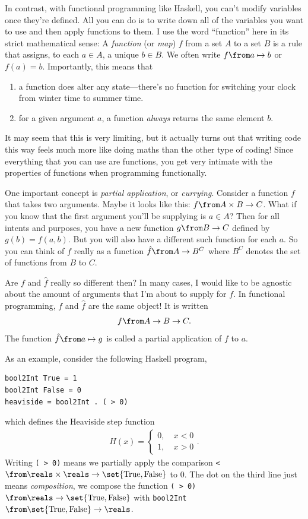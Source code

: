 In contrast, with functional programming like Haskell, you can't modify variables once they're defined.
All you can do is to write down all of the variables you want to use and then apply functions to them.
I use the word \enquote{function} here in its strict mathematical sense: A \emph{function} (or \emph{map}) $f$ from a set $A$ to a set $B$ is a rule that assigns, to each $a \in A$, a unique $b \in B$.
We often write $f \from a \mapsto b$ or $f(a) = b$.
Importantly, this means that
\begin{enumerate}
	\item a function does alter any state---there's no function for switching your clock from winter time to summer time.
	\item for a given argument $a$, a function \emph{always} returns the same element $b$.
\end{enumerate}

It may seem that this is very limiting, but it actually turns out that writing code this way feels much more like doing maths than the other type of coding!
Since everything that you can use are functions, you get very intimate with the properties of functions when programming functionally.

One important concept is \emph{partial application}, or \emph{currying}.
Consider a function $f$ that takes two arguments.
Maybe it looks like this: $f \from A \times B \to C$.
What if you know that the first argument you'll be supplying is $a \in A$?
Then for all intents and purposes, you have a new function $g \from B \to C$ defined by $g(b) = f(a, b)$.
But you will also have a different such function for each $a$.
So you can think of $f$ really as a function $\hat f\from A \to B^C$ where $B^C$ denotes the set of functions from $B$ to $C$.

Are $f$ and $\hat f$ really so different then?
In many cases, I would like to be agnostic about the amount of arguments that I'm about to supply for $f$.
In functional programming, $f$ and $\hat f$ are the same object!
It is written
\begin{align*}
	f \from A \to B \to C.
\end{align*}
The function $\hat f \from a \mapsto g$ is called a partial application of $f$ to $a$.

As an example, consider the following Haskell program,
\begin{verbatim}
bool2Int True = 1
bool2Int False = 0
heaviside = bool2Int . ( > 0)
\end{verbatim}
which defines the Heaviside step function
\begin{align*}
	H(x) =
	\begin{cases}
		0, \quad x < 0\\
		1, \quad x > 0
	\end{cases}.
\end{align*}
Writing \verb|( > 0)| means we partially apply the comparison \verb|<|$\from \reals \times \reals \to \set{\textrm{True}, \textrm{False}}$ to $0$.
The dot on the third line just means \emph{composition}, we compose the function \verb|( > 0)| $\from \reals \to \set{\textrm{True}, \textrm{False}}$ with \verb|bool2Int|$\from \set{\textrm{True}, \textrm{False}} \to \reals$.



